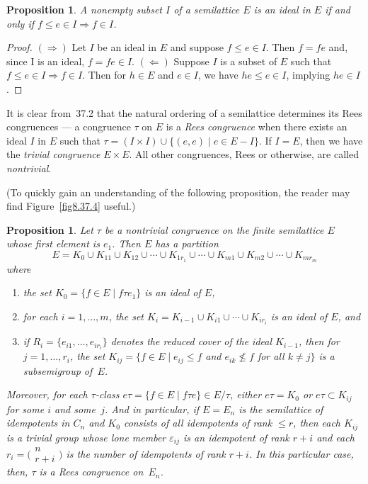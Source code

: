 \documentclass{surv-l}
\numberwithin{equation}{section}
\numberwithin{table}{section}
\numberwithin{figure}{section}
\newtheorem{proposition}[equation]{Proposition}
\theoremstyle{definition}
\begin{document}
\setcounter{equation}{1}
\begin{proposition}\label{prop8.37.2}
A nonempty subset $I$ of a semilattice $E$ is an ideal in $E$ if
and only if $f\leq e\in I \Rightarrow f\in I$.
\end{proposition}

\begin{proof}
$(\Rightarrow)$ Let $I$ be an ideal in $E$ and suppose $f\leq e\in
I$. Then $f=fe$ and, since I is an ideal, $ f=fe\in I$.
$(\Leftarrow)$ Suppose $I$ is a subset of $E$ such that $f\leq
e\in I \Rightarrow f\in I$. Then for $h\in E$ and $e\in I$, we
have $he\leq e\in I$, implying $he\in I$.
\end{proof}

It is clear from~37.2 that the natural ordering of a semilattice
determines its Rees congruences --- a congruence $\tau$ on $E$ is
a \emph{Rees congruence} when there exists
an ideal $I$ in $E$ such that $\tau= (I\times I) \cup\{(e,
e)\mid e\in E-I\}$. If $I =E$, then we have the \emph{trivial
congruence} $E\times E$. All other
congruences, Rees or otherwise, are called
\emph{nontrivial}.

(To quickly gain an understanding of the following proposition,
the reader may find Figure~\ref{fig8.37.4} useful.)

\begin{proposition}\label{prop8.37.3}
Let $\tau$ be a nontrivial congruence on the finite semilattice
$E$ whose first element is $e_{1}$. Then $E$ has a partition
\[
E=K_{0}\cup K_{11}\cup K_{12}\cup\cdots\cup
K_{1r_{1}}\cup\cdots\cup K_{m1}\cup K_{m2}\cup\cdots\cup
K_{mr_{m}}
\]
where
\begin{enumerate}
\item[(1)] the set $K_{0}=\{f\in E\mid f\tau e_{1}\}$ is an ideal of $E$,

\item[(2)] for each $i=1,\ldots, m$, the set
$K_{i}=K_{i-1}\cup K_{i1}\cup\cdots\cup K_{ir_{i}}$ is an
ideal of $E$, and

\item[(3)] if $R_{i}=\{e_{i1},\ldots, e_{ir_{i}}\}$ denotes
the reduced cover of the ideal $K_{i-1}$, then for
$j=1,\ldots, r_{i}$, the set $K_{ij}=\{f\in
E\mid e_{ij}\leq f$ and $e_{ik}\not\leq f$ for all $k\neq
j\}$ is a subsemigroup of~$E$.
\end{enumerate}
Moreover, for each $\tau$-class $e\tau=\{f\in E\mid f\tau
e\}\in E/\tau$, either $e\tau=K_{0}$ or $e\tau\subset K_{ij}$ for
some $i$ and some~$j$. And in particular, if $E=E_{n}$ is the
semilattice of idempotents in $C_{n}$ and $K_{0}$ consists of all
idempotents of rank $\leq r$, then each $K_{ij}$ is a trivial
group whose lone member $\varepsilon_{ij}$ is an idempotent of
rank $r+i$ and each $r_{i}=\big(\!\begin{smallmatrix}
n\\
r+i\end{smallmatrix}\!\big)$ is the number of idempotents of rank
$r+i$. In this particular case, then, $\tau$ is a Rees congruence
on~$E_{n}$.
\end{proposition}
\end{document}
